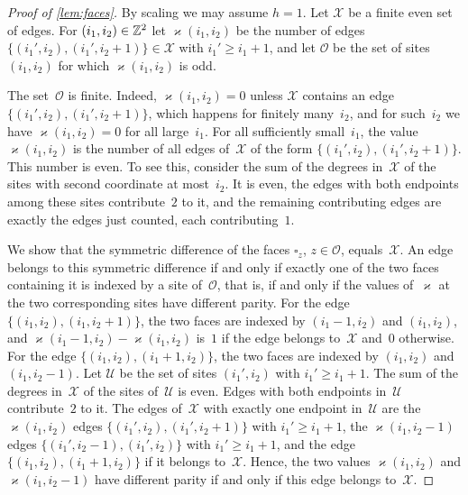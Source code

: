 \documentclass[11pt,letterpaper]{article}
\begin{document}
\begin{proof}[Proof of \cref{lem:faces}]
By scaling we may assume $h=1$. Let $\mathcal X$ be a finite even set of edges. For $(i_1,i_2)\in\mathbb Z^2$ let $\varkappa(i_1,i_2)$ be the number of edges $\{(i_1',i_2),(i_1',i_2+1)\}\in\mathcal X$ with $i_1'\ge i_1+1$, and let $\mathcal O$ be the set of sites $(i_1,i_2)$ for which $\varkappa(i_1,i_2)$ is odd.

The set~$\mathcal O$ is finite. Indeed, $\varkappa(i_1,i_2)=0$ unless $\mathcal X$ contains an edge $\{(i_1',i_2),(i_1',i_2+1)\}$, which happens for finitely many~$i_2$, and for such~$i_2$ we have $\varkappa(i_1,i_2)=0$ for all large~$i_1$. For all sufficiently small~$i_1$, the value $\varkappa(i_1,i_2)$ is the number of all edges of~$\mathcal X$ of the form $\{(i_1',i_2),(i_1',i_2+1)\}$. This number is even. To see this, consider the sum of the degrees in~$\mathcal X$ of the sites with second coordinate at most~$i_2$. It is even, the edges with both endpoints among these sites contribute~$2$ to it, and the remaining contributing edges are exactly the edges just counted, each contributing~$1$.

We show that the symmetric difference of the faces $\square_z$, $z\in\mathcal O$, equals~$\mathcal X$. An edge belongs to this symmetric difference if and only if exactly one of the two faces containing it is indexed by a site of~$\mathcal O$, that is, if and only if the values of~$\varkappa$ at the two corresponding sites have different parity. For the edge $\{(i_1,i_2),(i_1,i_2+1)\}$, the two faces are indexed by $(i_1-1,i_2)$ and $(i_1,i_2)$, and $\varkappa(i_1-1,i_2)-\varkappa(i_1,i_2)$ is~$1$ if the edge belongs to~$\mathcal X$ and~$0$ otherwise. For the edge $\{(i_1,i_2),(i_1+1,i_2)\}$, the two faces are indexed by $(i_1,i_2)$ and $(i_1,i_2-1)$. Let $\mathcal U$ be the set of sites $(i_1',i_2)$ with $i_1'\ge i_1+1$. The sum of the degrees in~$\mathcal X$ of the sites of~$\mathcal U$ is even. Edges with both endpoints in~$\mathcal U$ contribute~$2$ to it. The edges of~$\mathcal X$ with exactly one endpoint in~$\mathcal U$ are the $\varkappa(i_1,i_2)$ edges $\{(i_1',i_2),(i_1',i_2+1)\}$ with $i_1'\ge i_1+1$, the $\varkappa(i_1,i_2-1)$ edges $\{(i_1',i_2-1),(i_1',i_2)\}$ with $i_1'\ge i_1+1$, and the edge $\{(i_1,i_2),(i_1+1,i_2)\}$ if it belongs to~$\mathcal X$. Hence, the two values $\varkappa(i_1,i_2)$ and $\varkappa(i_1,i_2-1)$ have different parity if and only if this edge belongs to~$\mathcal X$.
\end{proof}

\end{document}
